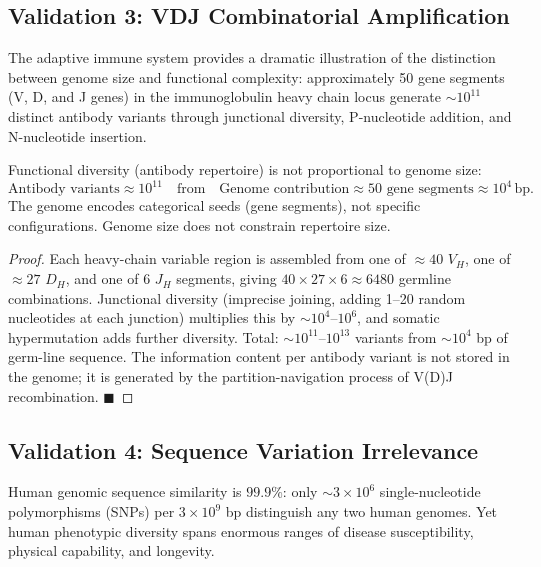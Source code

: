 \subsection{Validation 3: VDJ Combinatorial Amplification}
\label{ssec:val_vdj}

The adaptive immune system provides a dramatic illustration of the
distinction between genome size and functional complexity:
approximately 50 gene segments (V, D, and J genes) in the immunoglobulin
heavy chain locus generate $\sim 10^{11}$ distinct antibody variants
through junctional diversity, P-nucleotide addition, and N-nucleotide
insertion.

\begin{proposition}
\label{prop:vdj}
Functional diversity (antibody repertoire) is not proportional to genome size:
\begin{equation}
  \text{Antibody variants} \approx 10^{11}
    \quad \text{from} \quad
  \text{Genome contribution} \approx 50 \text{ gene segments}
    \approx 10^4\,\mathrm{bp}.
\end{equation}
The genome encodes categorical seeds (gene segments), not specific
configurations. Genome size does not constrain repertoire size.
\end{proposition}

\begin{proof}
Each heavy-chain variable region is assembled from one of $\approx 40$
$V_H$, one of $\approx 27$ $D_H$, and one of 6 $J_H$ segments, giving
$40 \times 27 \times 6 \approx 6480$ germline combinations. Junctional
diversity (imprecise joining, adding 1--20 random nucleotides at each
junction) multiplies this by $\sim 10^4$--$10^6$, and somatic
hypermutation adds further diversity. Total: $\sim 10^{11}$--$10^{13}$
variants from $\sim 10^4$ bp of germ-line sequence. The information
content per antibody variant is not stored in the genome; it is generated
by the partition-navigation process of V(D)J recombination. $\blacksquare$
\end{proof}

\subsection{Validation 4: Sequence Variation Irrelevance}
\label{ssec:val_snps}

Human genomic sequence similarity is $99.9\%$: only $\sim 3\times 10^6$
single-nucleotide polymorphisms (SNPs) per $3\times 10^9$ bp distinguish
any two human genomes. Yet human phenotypic diversity spans enormous
ranges of disease susceptibility, physical capability, and longevity.

